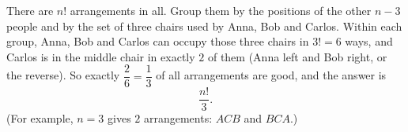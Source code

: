 There are $n!$ arrangements in all. Group them by the positions of the other $n-3$ people and by the set of three chairs used by Anna, Bob and Carlos. Within each group, Anna, Bob and Carlos can occupy those three chairs in $3!=6$ ways, and Carlos is in the middle chair in exactly $2$ of them (Anna left and Bob right, or the reverse). So exactly $\dfrac{2}{6}=\dfrac{1}{3}$ of all arrangements are good, and the answer is
\[
\boxed{\dfrac{n!}{3}}.
\]
(For example, $n=3$ gives $2$ arrangements: $ACB$ and $BCA$.)
